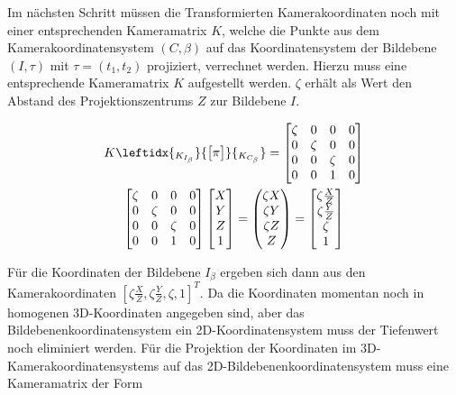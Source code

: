 Im nächsten Schritt müssen die Transformierten Kamerakoordinaten noch mit einer entsprechenden Kameramatrix $K$, welche die Punkte aus dem Kamerakoordinatensystem $(C,\beta)$ auf das Koordinatensystem der Bildebene $(I,\tau)$ mit $\tau = (t_1,t_2)$ projiziert, verrechnet werden. Hierzu muss eine entsprechende Kameramatrix $K$ aufgestellt werden. $\zeta$ erhält als Wert den Abstand des Projektionszentrums $Z$ zur Bildebene $I$.

	\begin{gather}
K
\leftidx{_{K_{I_\beta}}}{\begin{bmatrix}
	\pi
	\end{bmatrix}}{_{K_{C_\beta}}}
=
\begin{bmatrix}
\zeta&0&0&0\\
0&\zeta&0&0\\
0&0&\zeta&0\\
0&0&1&0
\end{bmatrix}\\
\begin{bmatrix}
\zeta&0&0&0\\
0&\zeta&0&0\\
0&0&\zeta&0\\
0&0&1&0
\end{bmatrix}
\begin{bmatrix}
X\\Y\\Z\\1
\end{bmatrix} =
\begin{pmatrix}
\zeta X\\ \zeta Y\\ \zeta Z \\ Z
\end{pmatrix}
=
\begin{bmatrix}
\zeta \frac{X}{Z}\\ \zeta \frac{Y}{Z}\\ \zeta  \\ 1
\end{bmatrix}
\end{gather}

Für die Koordinaten der Bildebene $I_\beta$ ergeben sich dann aus den Kamerakoordinaten $[\zeta \frac{X}{Z},\zeta\frac{Y}{Z},\zeta,1]^T$. Da die Koordinaten momentan noch in homogenen 3D-Koordinaten angegeben sind, aber das Bildebenenkoordinatensystem ein 2D-Koordinatensystem muss der Tiefenwert noch eliminiert werden. Für die Projektion der Koordinaten im 3D-Kamerakoordinatensystems auf das 2D-Bildebenenkoordinatensystem muss eine Kameramatrix der Form		
		
